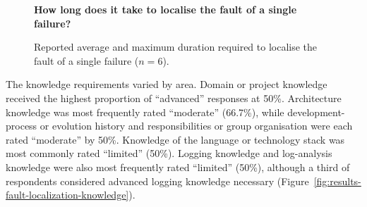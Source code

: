 \begin{figure}[H]
    \centering
    \textbf{\small
    How long does it take to localise the fault of a single failure?}

    \vspace{0.5em}
    \caption{Reported average and maximum duration required to localise
    the fault of a single failure ($n=6$).}
    \label{fig:results-fault-localization-duration}
\end{figure}

The knowledge requirements varied by area. Domain or project knowledge received the
highest proportion of ``advanced'' responses at 50\%. Architecture knowledge was
most frequently rated ``moderate'' (66.7\%), while development-process or evolution
history and responsibilities or group organisation were each rated ``moderate'' by
50\%. Knowledge of the language or technology stack was most commonly rated
``limited'' (50\%). Logging knowledge and log-analysis knowledge were also most
frequently rated ``limited'' (50\%), although a third of respondents considered
advanced logging knowledge necessary
(Figure~\ref{fig:results-fault-localization-knowledge}).


